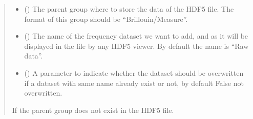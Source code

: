 \documentclass[letterpaper,10pt,english]{sphinxmanual}
\begin{document}
\begin{fulllineitems}
\begin{fulllineitems}
\begin{quote}
\begin{description}
\begin{itemize}
\item {} 
\sphinxAtStartPar
{} (\sphinxstyleliteralemphasis{\sphinxupquote{, }}) \textendash{} The parent group where to store the data of the HDF5 file. The format of this group should be “Brillouin/Measure”.

\item {} 
\sphinxAtStartPar
{} (\sphinxstyleliteralemphasis{\sphinxupquote{, }}) \textendash{} The name of the frequency dataset we want to add, and as it will be displayed in the file by any HDF5 viewer. By default the name is “Raw data”.

\item {} 
\sphinxAtStartPar
{} (\sphinxstyleliteralemphasis{\sphinxupquote{, }}) \textendash{} A parameter to indicate whether the dataset should be overwritten if a dataset with same name already exist or not, by default False \sphinxhyphen{} not overwritten.

\end{itemize}

\sphinxAtStartPar
{} \textendash{} If the parent group does not exist in the HDF5 file.

\end{description}\end{quote}

\end{fulllineitems}



\end{fulllineitems}
\end{document}
